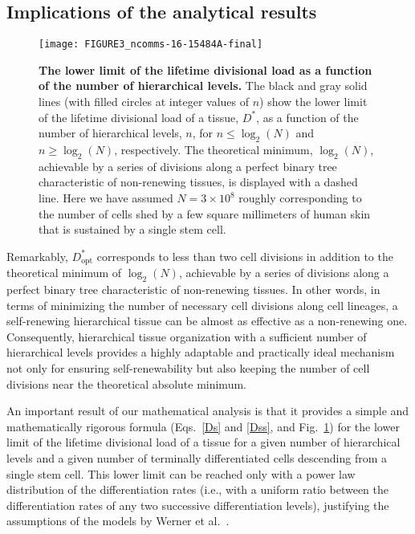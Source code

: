 \documentclass[aps,singlecolumn]{revtex4-1}
\begin{document}
\subsection*{Implications of the analytical results}

\begin{figure}
\centerline{\texttt{[image: FIGURE3\_ncomms-16-15484A-final]}}
\caption{
{\bf The lower limit of the lifetime divisional load as a
function of the number of hierarchical levels.}
%
The black and gray solid lines (with filled circles at integer values
of $n$) show the lower limit of the lifetime divisional load of a
tissue, $D^*$, as a function of the number of hierarchical levels, $n$,
for $n\leq\log_2(N)$ and $n\geq\log_2(N)$, respectively. The
theoretical minimum, $\log_2(N)$, achievable by a series of divisions
along a perfect binary tree characteristic of non-renewing tissues, is
displayed with a dashed line. Here we have assumed $N=3 \times 10^8$
roughly corresponding to the number of cells shed by
a few square millimeters of human
skin that is sustained by a single stem cell.
%
}
\label{fig3}
\end{figure}

Remarkably, $D^*_\textrm{opt}$ corresponds to less than two cell divisions in
addition to the theoretical minimum
of $\log_2(N)$, achievable by a series of
divisions along a perfect binary tree characteristic of non-renewing
tissues. In other words, in terms of minimizing the number of necessary cell
divisions along cell lineages, a self-renewing hierarchical tissue
can be almost as effective as a non-renewing one.
Consequently, hierarchical tissue
organization with a sufficient number of hierarchical levels provides
a highly adaptable and practically ideal mechanism not only for ensuring
self-renewability but also
keeping the number of cell divisions near the theoretical absolute
minimum.


An important result of our mathematical analysis is that it provides a
simple and mathematically rigorous formula (Eqs.~\ref{Ds} and
\ref{Dss}, and Fig.~\ref{fig3}) for the lower limit of the lifetime
divisional load of a tissue for a given number of hierarchical levels
and a given number of terminally differentiated cells descending from a
single stem cell. This lower limit can be reached only with a power law
distribution of the differentiation rates (i.e., with a uniform ratio
between the differentiation rates of any two successive differentiation
levels), justifying the assumptions of the models by Werner et al.\
\cite{Werner:2011,Werner:2013}.
\end{document}
